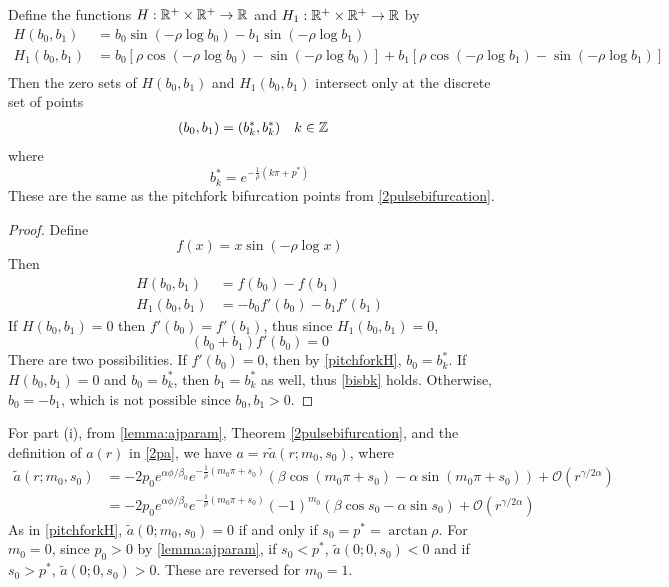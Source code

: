 \documentclass[thesis.tex]{subfiles}
\begin{document}
\begin{lemma}\label{lemma:Hoverlaplemma}
Define the functions $H: \mathbb{R}^+ \times \mathbb{R}^+ \rightarrow \mathbb{R}$ and $H_1: \mathbb{R}^+ \times \mathbb{R}^+ \rightarrow \mathbb{R}$ by 
\begin{align}
H(b_0, b_1) &= b_0 \sin \left( -\rho \log b_0 \right) - b_1 \sin \left( -\rho \log b_1 \right) \label{perdefH} \\
H_1(b_0, b_1) &= b_0 \left[ \rho \cos \left( -\rho \log b_0 \right) - \sin \left( -\rho \log b_0 \right) \right] + b_1 \left[ \rho \cos \left( -\rho \log b_1 \right) - \sin \left( -\rho \log b_1 \right) \right]  \label{perdefH1} \\
\end{align}
Then the zero sets of $H(b_0, b_1)$ and $H_1(b_0, b_1)$ intersect only at the discrete set of points
\begin{align}\label{bisbk}
(b_0, b_1) &= (b_k^*, b_k^*) && k \in \mathbb{Z}
\end{align}
where 
\begin{equation*}
b^*_k = e^{-\frac{1}{\rho} (k \pi + p^*) }
\end{equation*}
These are the same as the pitchfork bifurcation points from \cref{2pulsebifurcation}.
\begin{proof}
Define
\[
f(x) = x \sin \left( -\rho \log x \right)
\]
Then
\begin{align*}
H(b_0, b_1) &= f(b_0) - f(b_1) \\
H_1(b_0, b_1) &= -b_0 f'(b_0) - b_1 f'(b_1)
\end{align*}
If $H(b_0, b_1) = 0$ then $f'(b_0) = f'(b_1)$, thus since $H_1(b_0, b_1) = 0$,
\[
(b_0 + b_1) f'(b_0) = 0
\]
There are two possibilities. If $f'(b_0) = 0$, then by \cref{pitchforkH}, $b_0 = b_k^*$. If $H(b_0, b_1) = 0$ and $b_0 = b_k^*$, then $b_1 = b_k^*$ as well, thus \cref{bisbk} holds. Otherwise, $b_0 = -b_1$, which is not possible since $b_0, b_1 > 0$.
\end{proof}
\end{lemma}

For part (i), from \cref{lemma:ajparam}, Theorem \cref{2pulsebifurcation}, and the definition of $a(r)$ in \cref{2pa}, we have $a = r \tilde{a}(r; m_0, s_0)$, where
\begin{align*}
\tilde{a}(r; m_0, s_0) &= -2 p_0 e^{\alpha \phi/\beta_0} e^{-\frac{1}{\rho}(m_0 \pi + s_0)} \left( \beta \cos\left(m_0 \pi + s_0 \right) - \alpha \sin \left(m_0 \pi + s_0 \right) \right) + \mathcal{O}(r^{\gamma/2\alpha}) \\
&= -2 p_0 e^{\alpha \phi/\beta_0} e^{-\frac{1}{\rho}(m_0 \pi + s_0)} (-1)^{m_0} \left( \beta \cos s_0 - \alpha \sin s_0 \right) + \mathcal{O}(r^{\gamma/2\alpha})
\end{align*}
As in \cref{pitchforkH}, $\tilde{a}(0; m_0, s_0) = 0$ if and only if $s_0 = p^* = \arctan \rho$. For $m_0 = 0$, since $p_0 > 0$ by \cref{lemma:ajparam}, if $s_0 < p^*$, $\tilde{a}(0; 0, s_0) < 0$ and if $s_0 > p^*$, $\tilde{a}(0; 0, s_0) > 0$. These are reversed for $m_0 = 1$.
\end{document}

